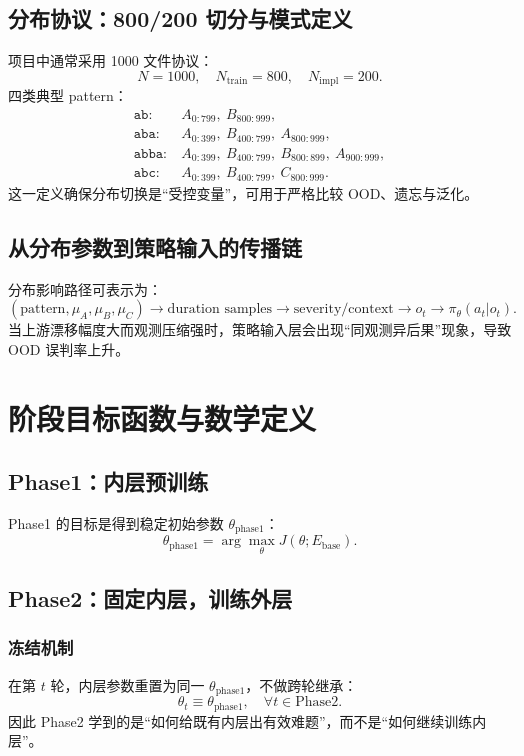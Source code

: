 \documentclass[UTF8,11pt,a4paper]{ctexart}
\begin{document}
\subsection{分布协议：800/200 切分与模式定义}
项目中通常采用 1000 文件协议：
\begin{equation}
N=1000,\quad N_{\text{train}}=800,\quad N_{\text{impl}}=200.
\end{equation}
四类典型 pattern：
\begin{align}
\texttt{ab}:&\ A_{0:799},\ B_{800:999},\\
\texttt{aba}:&\ A_{0:399},\ B_{400:799},\ A_{800:999},\\
\texttt{abba}:&\ A_{0:399},\ B_{400:799},\ B_{800:899},\ A_{900:999},\\
\texttt{abc}:&\ A_{0:399},\ B_{400:799},\ C_{800:999}.
\end{align}
这一定义确保分布切换是“受控变量”，可用于严格比较 OOD、遗忘与泛化。

\subsection{从分布参数到策略输入的传播链}
分布影响路径可表示为：
\begin{equation}
(\text{pattern},\mu_A,\mu_B,\mu_C)
\rightarrow
\text{duration samples}
\rightarrow
\text{severity/context}
\rightarrow
o_t
\rightarrow
\pi_\theta(a_t|o_t).
\end{equation}
当上游漂移幅度大而观测压缩强时，策略输入层会出现“同观测异后果”现象，导致 OOD 误判率上升。

\section{阶段目标函数与数学定义}
\subsection{Phase1：内层预训练}
Phase1 的目标是得到稳定初始参数 \(\theta_{\text{phase1}}\)：
\begin{equation}
\theta_{\text{phase1}}=\arg\max_\theta J(\theta;E_{\text{base}}).
\end{equation}

\subsection{Phase2：固定内层，训练外层}
\subsubsection{冻结机制}
在第 \(t\) 轮，内层参数重置为同一 \(\theta_{\text{phase1}}\)，不做跨轮继承：
\begin{equation}
\theta_t \equiv \theta_{\text{phase1}},\quad \forall t\in \text{Phase2}.
\end{equation}
因此 Phase2 学到的是“如何给既有内层出有效难题”，而不是“如何继续训练内层”。
\end{document}
